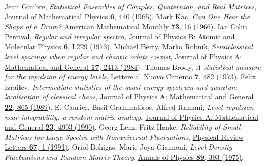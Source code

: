 \documentclass[a4paper,11pt,twoside]{article}
\begin{document}
\begin{thebibliography}{99}
     Jean Ginibre, {\it Statistical Ensembles of Comples, Quaternion, and Real Matrices}, \href{https://aip.scitation.org/doi/10.1063/1.1704292}{Journal of Mathematical Physics {\bf 6}, 440 (1965)}.
     Mark Kac, {\it Can One Hear the Shape of a Drum?} \href{https://www.maa.org/sites/default/files/pdf/upload_library/22/Ford/MarkKac.pdf}{American Mathematical Monthly {\bf 73}, 16 (1966)}.
     Ian Colin Percival, {\it Regular and irregular spectra}, \href{https://iopscience.iop.org/article/10.1088/0022-3700/6/9/002/pdf}{Journal of Physics B: Atomic and Molecular Physics {\bf 6}, L229 (1973)}.
     Michael Berry, Marko Robnik, {\it Semiclassical level spacings when regular and chaotic orbits coexist}, \href{https://iopscience.iop.org/article/10.1088/0305-4470/17/12/013}{Journal of Physics A: Mathematical and General {\bf 17}, 2413 (1984)}.
     Thomas Brody, {\it A statistical measure for the repulsion of energy levels}, \href{https://link.springer.com/article/10.1007/BF02727859}{Lettere al Nuovo Cimento {\bf 7}, 482 (1973)}.
     Felix Izrailev, {\it Intermediate statistics of the quasi-energy spectrum and quantum localisation of classical chaos}, \href{https://iopscience.iop.org/article/10.1088/0305-4470/22/7/017/meta}{Journal of Physics A: Mathematical and General {\bf 22}, 865 (1989)}.
     E. Caurier, Basil Grammaticos, Alfred Ramani, {\it Level repulsion near integrability: a random matrix analogy}, \href{https://iopscience.iop.org/article/10.1088/0305-4470/23/21/029}{Journal of Physics A: Mathematical and General {\bf 23}, 4903 (1990)}.
     Georg Lenz, Fritz Haake, {\it Reliability of Small Matrices for Large Spectra with Nonuniversal Fluctuations}, \href{https://journals.aps.org/prl/abstract/10.1103/PhysRevLett.67.1}{Physical Review Letters {\bf 67}, 1 (1991)}.
     Oriol Bohigas, Marie-Joya Giannoni, {\it Level Density Fluctuations and Random Matrix Theory}, \href{https://www.sciencedirect.com/science/article/abs/pii/0003491675901876}{Annals of Physics {\bf 89}, 393 (1975)}.
\end{thebibliography}
\end{document}

